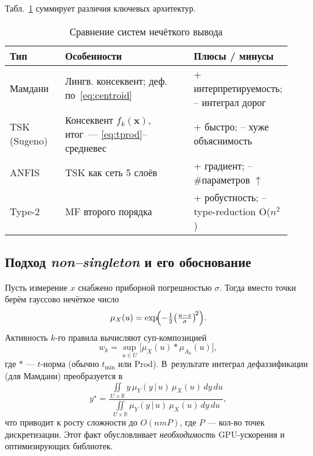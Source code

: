 Табл.~\ref{tab:sys_comp} суммирует различия ключевых архитектур.

\begin{table}[h]
\centering\small
\caption{Сравнение систем нечёткого вывода}
\label{tab:sys_comp}
\begin{tabular}{@{}p{0.21\linewidth}p{0.57\linewidth}p{0.14\linewidth}@{}}
\toprule
\textbf{Тип} & \textbf{Особенности} & \textbf{Плюсы / минусы} \\ \midrule
Мамдани & Лингв. консеквент; деф.\,по~\eqref{eq:centroid} &
          + интерпретируемость; – интеграл дорог \\[2pt]
TSK (Sugeno) & Консеквент $f_k(\mathbf x)$, итог~— \eqref{eq:tprod}–средневес & + быстро; – хуже объяснимость \\[2pt]
ANFIS & TSK как сеть 5 слоёв & + градиент; – \#параметров $\uparrow$ \\[2pt]
Type-2 & MF второго порядка & + робустность; – type-reduction O($n^2$) \\
\bottomrule
\end{tabular}
\end{table}

\subsection{Подход \emph{non–singleton} и его обоснование}
\label{subsec:nsi_deep}

Пусть измерение $x$ снабжено приборной погрешностью $\sigma$.
Тогда вместо точки берём гауссово нечёткое число
\begin{equation}
  \mu_{X}(u)=\exp\!\Bigl(
    -\tfrac12\bigl(\tfrac{u-x}{\sigma}\bigr)^{\!2}\Bigr).
  \label{eq:gauss_nsi}
\end{equation}
Активность $k$-го правила вычисляют суп-композицией
\begin{equation}
  w_k=\sup_{u\in U}
      \bigl[\mu_{X}(u)\,\boldsymbol{\ast}\,
            \mu_{A_k}(u)\bigr],
  \label{eq:nsi_sup}
\end{equation}
где $\boldsymbol{\ast}$ — $t$-норма (обычно $t_{\min}$ или Prod).
В~результате интеграл дефаззификации (для Мамдани) преобразуется в
\begin{equation}
  y^\star=\frac{\displaystyle
      \iint\limits_{U\times\mathbb R}
      y\,
      \mu_Y(y\,|\,u)\,
      \mu_{X}(u)\,dy\,du}
    {\displaystyle
      \iint\limits_{U\times\mathbb R}
      \mu_Y(y\,|\,u)\,
      \mu_{X}(u)\,dy\,du},
  \label{eq:nsi_defuzz}
\end{equation}
что приводит к росту сложности до $O(nmP)$, где $P$ —
кол-во точек дискретизации. Этот факт обусловливает
\emph{необходимость} GPU-ускорения и оптимизирующих библиотек.

